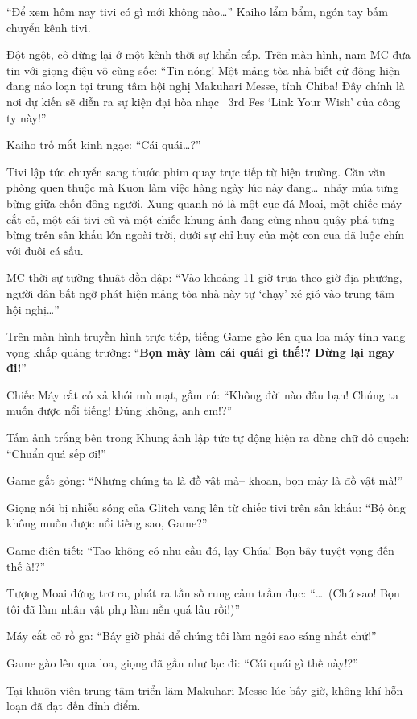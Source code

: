 \documentclass[../main.tex]{subfiles}
\begin{document}
``Để xem hôm nay tivi có gì mới không nào\dots'' Kaiho lẩm bẩm, ngón tay bấm chuyển kênh tivi.

Đột ngột, cô dừng lại ở một kênh thời sự khẩn cấp. Trên màn hình, nam MC đưa tin với giọng điệu vô cùng sốc: ``Tin nóng! Một mảng tòa nhà biết cử động hiện đang náo loạn tại trung tâm hội nghị Makuhari Messe, tỉnh Chiba! Đây chính là nơi dự kiến sẽ diễn ra sự kiện đại hòa nhạc \hll\ 3rd Fes `Link Your Wish' của công ty này!''

Kaiho trố mắt kinh ngạc: ``Cái quái\dots?''

Tivi lập tức chuyển sang thước phim quay trực tiếp từ hiện trường. Căn văn phòng quen thuộc mà Kuon làm việc hàng ngày lúc này đang\dots\ nhảy múa tưng bừng giữa chốn đông người. Xung quanh nó là một cục đá Moai, một chiếc máy cắt cỏ, một cái tivi cũ và một chiếc khung ảnh đang cùng nhau quậy phá tưng bừng trên sân khấu lớn ngoài trời, dưới sự chỉ huy của một con cua đã luộc chín với đuôi cá sấu.

MC thời sự tường thuật dồn dập: ``Vào khoảng 11 giờ trưa theo giờ địa phương, người dân bất ngờ phát hiện mảng tòa nhà này tự `chạy' xé gió vào trung tâm hội nghị\dots''

Trên màn hình truyền hình trực tiếp, tiếng Game gào lên qua loa máy tính vang vọng khắp quảng trường: ``\textbf{Bọn mày làm cái quái gì thế!? Dừng lại ngay đi!}''

Chiếc Máy cắt cỏ xả khói mù mạt, gầm rú: ``Không đời nào đâu bạn! Chúng ta muốn được nổi tiếng! Đúng không, anh em!?''

Tấm ảnh trắng bên trong Khung ảnh lập tức tự động hiện ra dòng chữ đỏ quạch: ``Chuẩn quá sếp ơi!''

Game gắt gỏng: ``Nhưng chúng ta là đồ vật mà-- khoan, bọn mày là đồ vật mà!''

Giọng nói bị nhiễu sóng của Glitch vang lên từ chiếc tivi trên sân khấu: ``Bộ ông không muốn được nổi tiếng sao, Game?''

Game điên tiết: ``Tao không có nhu cầu đó, lạy Chúa! Bọn bây tuyệt vọng đến thế à!?''

Tượng Moai đứng trơ ra, phát ra tần số rung cảm trầm đục: ``\dots\ (Chứ sao! Bọn tôi đã làm nhân vật phụ làm nền quá lâu rồi!)''

Máy cắt cỏ rồ ga: ``Bây giờ phải để chúng tôi làm ngôi sao sáng nhất chứ!''

Game gào lên qua loa, giọng đã gần như lạc đi: ``Cái quái gì thế này!?''

Tại khuôn viên trung tâm triển lãm Makuhari Messe lúc bấy giờ, không khí hỗn loạn đã đạt đến đỉnh điểm.
\end{document}
